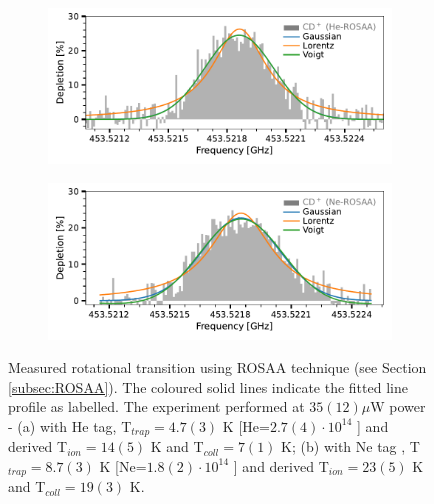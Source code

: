 \begin{figure}[!htb]
    \centering
    \begin{subfigure}[b]{0.49\textwidth}
        \centering
        \includegraphics[width=1\textwidth]{figures/measurements/THz/thz_CD+_He.pdf}
        \caption{}
        \label{fig:thz:HeCD+}
    \end{subfigure}
    \hfill
    \begin{subfigure}[b]{0.49\textwidth}
        \centering
        \includegraphics[width=1\textwidth]{figures/measurements/THz/thz_CD+_Ne.pdf}
        \caption{}
        \label{fig:thz:NeCD+}
    \end{subfigure}
    \caption{Measured \CD \CDline rotational transition using ROSAA technique  (see Section \ref{subsec:ROSAA}). The coloured solid lines indicate the fitted line profile as labelled. The experiment performed at $35(12) \mu$W power - (a) with He tag, T$_{trap}=4.7(3)$ K [He=$2.7(4) \cdot 10^{14}$ \percc] and derived T$_{ion} = 14(5)$ K and T$_{coll} = 7(1)$ K; (b) with Ne tag , T$_{trap}=8.7(3)$ K [Ne=$1.8(2)\cdot 10^{14}$ \percc] and derived T$_{ion} = 23(5)$ K and T$_{coll} = 19(3)$ K.}
    \label{fig:thz}
\end{figure}